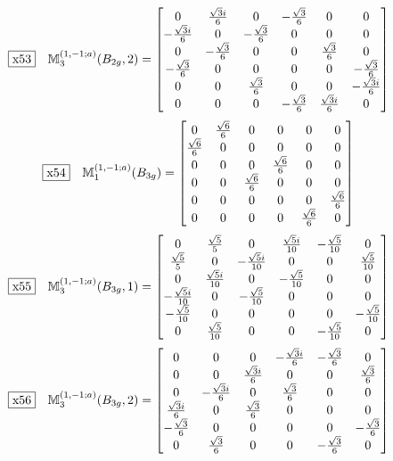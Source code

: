 \documentclass[fleqn,10pt,landscape]{jsarticle}
\begin{document}
\begin{dmath*}
\fbox{x53}\quad \mathbb{M}_{3}^{(1,-1;a)}(B_{2g},2)=\begin{bmatrix} 0 & \frac{\sqrt{3} i}{6} & 0 & - \frac{\sqrt{3}}{6} & 0 & 0 \\ - \frac{\sqrt{3} i}{6} & 0 & - \frac{\sqrt{3}}{6} & 0 & 0 & 0 \\ 0 & - \frac{\sqrt{3}}{6} & 0 & 0 & \frac{\sqrt{3}}{6} & 0 \\ - \frac{\sqrt{3}}{6} & 0 & 0 & 0 & 0 & - \frac{\sqrt{3}}{6} \\ 0 & 0 & \frac{\sqrt{3}}{6} & 0 & 0 & - \frac{\sqrt{3} i}{6} \\ 0 & 0 & 0 & - \frac{\sqrt{3}}{6} & \frac{\sqrt{3} i}{6} & 0 \end{bmatrix}
\end{dmath*}
\begin{dmath*}
\fbox{x54}\quad \mathbb{M}_{1}^{(1,-1;a)}(B_{3g})=\begin{bmatrix} 0 & \frac{\sqrt{6}}{6} & 0 & 0 & 0 & 0 \\ \frac{\sqrt{6}}{6} & 0 & 0 & 0 & 0 & 0 \\ 0 & 0 & 0 & \frac{\sqrt{6}}{6} & 0 & 0 \\ 0 & 0 & \frac{\sqrt{6}}{6} & 0 & 0 & 0 \\ 0 & 0 & 0 & 0 & 0 & \frac{\sqrt{6}}{6} \\ 0 & 0 & 0 & 0 & \frac{\sqrt{6}}{6} & 0 \end{bmatrix}
\end{dmath*}
\begin{dmath*}
\fbox{x55}\quad \mathbb{M}_{3}^{(1,-1;a)}(B_{3g},1)=\begin{bmatrix} 0 & \frac{\sqrt{5}}{5} & 0 & \frac{\sqrt{5} i}{10} & - \frac{\sqrt{5}}{10} & 0 \\ \frac{\sqrt{5}}{5} & 0 & - \frac{\sqrt{5} i}{10} & 0 & 0 & \frac{\sqrt{5}}{10} \\ 0 & \frac{\sqrt{5} i}{10} & 0 & - \frac{\sqrt{5}}{10} & 0 & 0 \\ - \frac{\sqrt{5} i}{10} & 0 & - \frac{\sqrt{5}}{10} & 0 & 0 & 0 \\ - \frac{\sqrt{5}}{10} & 0 & 0 & 0 & 0 & - \frac{\sqrt{5}}{10} \\ 0 & \frac{\sqrt{5}}{10} & 0 & 0 & - \frac{\sqrt{5}}{10} & 0 \end{bmatrix}
\end{dmath*}
\begin{dmath*}
\fbox{x56}\quad \mathbb{M}_{3}^{(1,-1;a)}(B_{3g},2)=\begin{bmatrix} 0 & 0 & 0 & - \frac{\sqrt{3} i}{6} & - \frac{\sqrt{3}}{6} & 0 \\ 0 & 0 & \frac{\sqrt{3} i}{6} & 0 & 0 & \frac{\sqrt{3}}{6} \\ 0 & - \frac{\sqrt{3} i}{6} & 0 & \frac{\sqrt{3}}{6} & 0 & 0 \\ \frac{\sqrt{3} i}{6} & 0 & \frac{\sqrt{3}}{6} & 0 & 0 & 0 \\ - \frac{\sqrt{3}}{6} & 0 & 0 & 0 & 0 & - \frac{\sqrt{3}}{6} \\ 0 & \frac{\sqrt{3}}{6} & 0 & 0 & - \frac{\sqrt{3}}{6} & 0 \end{bmatrix}
\end{dmath*}
\end{document}
